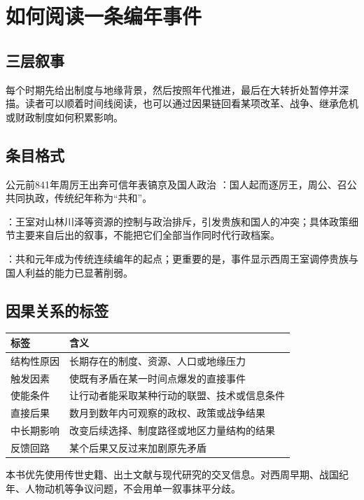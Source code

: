 \chapter{如何阅读一条编年事件}

\section{三层叙事}

每个时期先给出制度与地缘背景，然后按照年代推进，最后在大转折处暂停并深描。读者可以顺着时间线阅读，也可以通过因果链回看某项改革、战争、继承危机或财政制度如何积累影响。

\section{条目格式}

\begin{event}{公元前841年}{周厉王出奔}{可信年表}{镐京及国人政治}
：国人起而逐厉王，周公、召公共同执政，传统纪年称为“共和”。

：王室对山林川泽等资源的控制与政治排斥，引发贵族和国人的冲突；具体政策细节主要来自后出的叙事，不能把它们全部当作同时代行政档案。

：共和元年成为传统连续编年的起点；更重要的是，事件显示西周王室调停贵族与国人利益的能力已显著削弱。
\end{event}

\section{因果关系的标签}

\begin{tabularx}{\linewidth}{@{}l X@{}}
\toprule
标签 & 含义 \\
\midrule
结构性原因 & 长期存在的制度、资源、人口或地缘压力 \\
触发因素 & 使既有矛盾在某一时间点爆发的直接事件 \\
使能条件 & 让行动者能采取某种行动的联盟、技术或信息条件 \\
直接后果 & 数月到数年内可观察的政权、政策或战争结果 \\
中长期影响 & 改变后续选择、制度路径或地区力量结构的结果 \\
反馈回路 & 某个后果又反过来加剧原先矛盾 \\
\bottomrule
\end{tabularx}

\begin{sourcenote}
本书优先使用传世史籍、出土文献与现代研究的交叉信息。对西周早期、战国纪年、人物动机等争议问题，不会用单一叙事抹平分歧。
\end{sourcenote}
